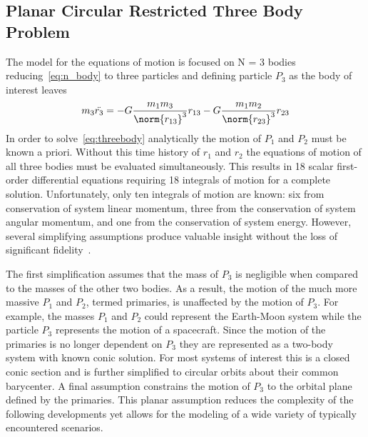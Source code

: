\subsection{Planar Circular Restricted Three Body Problem}
The model for the equations of motion is focused on N = 3 bodies reducing~\eqref{eq:n_body} to three particles and defining particle \(P_3\) as the body of interest leaves
\begin{equation}
	m_3\ddot{r_3} = -G \frac{m_1 m_3}{\norm{r_{13}}^3} r_{13} - G \frac{m_1 m_2}{\norm{r_{23}}^3} r_{23}
	\label{eq:threebody}
\end{equation}
In order to solve~\eqref{eq:threebody} analytically the motion of \( P_1 \) and \( P_2\) must be known a priori. 
Without this time history of \( r_1\) and \( r_2\) the equations of motion of all three bodies must be evaluated simultaneously. 
This results in 18 scalar first-order differential equations requiring 18 integrals of motion for a complete solution.
Unfortunately, only ten integrals of motion are known: six from conservation of system linear momentum, three from the conservation of system angular momentum, and one from the conservation of system energy.
However, several simplifying assumptions produce valuable insight without the loss of significant fidelity~\cite{szebehely1967}.

The first simplification assumes that the mass of \( P_3\) is negligible when compared to the masses of the other two bodies.
As a result, the motion of the much more massive \(P_1\) and \(P_2\), termed primaries, is unaffected by the motion of \(P_3\).
For example, the masses \(P_1\) and \(P_2\) could represent the Earth-Moon system while the particle \(P_3\) represents the motion of a spacecraft.
Since the motion of the primaries is no longer dependent on \(P_3\) they are represented as a two-body system with known conic solution.
For most systems of interest this is a closed conic section and is further simplified to circular orbits about their common barycenter.
A final assumption constrains the motion of \(P_3\) to the orbital plane defined by the primaries. 
This planar assumption reduces the complexity of the following developments yet allows for the modeling of a wide variety of typically encountered scenarios.

